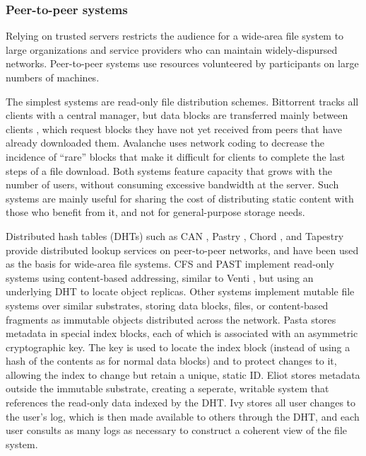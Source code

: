 
\subsubsection{Peer-to-peer systems}

Relying on trusted servers restricts the audience for a wide-area file system to large organizations and service providers who can maintain widely-dispursed networks. Peer-to-peer systems use resources volunteered by participants on large numbers of machines.

The simplest systems are read-only file distribution schemes. Bittorrent tracks all clients with a central manager, but data blocks are transferred mainly between clients \cite{cohen,pouwelse}, which request blocks they have not yet received from peers that have already downloaded them. Avalanche \cite{gkantsidis} uses network coding to decrease the incidence of ``rare'' blocks that make it difficult for clients to complete the last steps of a file download. Both systems feature capacity that grows with the number of users, without consuming excessive bandwidth at the server. Such systems are mainly useful for sharing the cost of distributing static content with those who benefit from it, and not for general-purpose storage needs.

Distributed hash tables (DHTs) such as CAN \cite{ratnasamy}, Pastry \cite{rowstron01b}, Chord \cite{stoica}, and Tapestry \cite{zhao01} provide distributed lookup services on peer-to-peer networks, and have been used as the basis for wide-area file systems. CFS \cite{dabek} and PAST \cite{rowstron01a} implement read-only systems using content-based addressing, similar to Venti \cite{quinlan}, but using an underlying DHT to locate object replicas. Other systems implement mutable file systems over similar substrates, storing data blocks, files, or content-based fragments \cite{rabin81} as immutable objects distributed across the network. Pasta \cite{moreton} stores metadata in special index blocks, each of which is associated with an asymmetric cryptographic key. The key is used to locate the index block (instead of using a hash of the contents as for normal data blocks) and to protect changes to it, allowing the index to change but retain a unique, static ID. Eliot \cite{stein02} stores metadata outside the immutable substrate, creating a seperate, writable system that references the read-only data indexed by the DHT. Ivy \cite{muthitacharoen02} stores all user changes to the user's log, which is then made available to others through the DHT, and each user consults as many logs as necessary to construct a coherent view of the file system.

